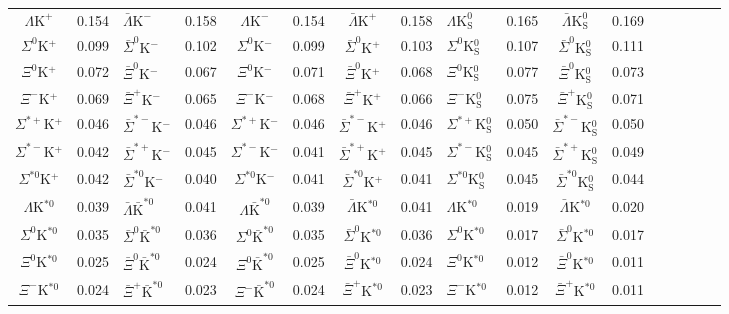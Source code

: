 \documentclass[ALICE,manyauthors]{cernphprep}
\newcommand{\LamKchP}{$\Lambda\mathrm{K^{+}}$\xspace}
\newcommand{\ALamKchM}{$\bar{\Lambda}\mathrm{K^{-}}$\xspace}
\newcommand{\LamKchM}{$\Lambda\mathrm{K^{-}}$\xspace}
\newcommand{\ALamKchP}{$\bar{\Lambda}\mathrm{K^{+}}$\xspace}
\newcommand{\LamKs}{$\Lambda\mathrm{K^{0}_{S}}$\xspace}
\newcommand{\ALamKs}{$\bar{\Lambda}\mathrm{K^{0}_{S}}$\xspace}
\begin{document}
\begin{landscape}
\begin{table}[htbp]
{\begin{tabular}{|c|cV{5.0}c|cV{5.0}c|cV{5.0}c|cV{5.0}c|cV{5.0}c|c|}
  \LamKchP & 0.154 & \ALamKchM & 0.158 & \LamKchM & 0.154 & \ALamKchP & 0.158 & \LamKs & 0.165 & \ALamKs & 0.169 \\
  $\Sigma^{0}$K$^{+}$ & 0.099 & $\bar{\Sigma}^{0}$K$^{-}$ & 0.102 & $\Sigma^{0}$K$^{-}$ & 0.099 & $\bar{\Sigma}^{0}$K$^{+}$ & 0.103 & $\Sigma^{0}$K$^{0}_{\mathrm{S}}$ & 0.107 & $\bar{\Sigma}^{0}$K$^{0}_{\mathrm{S}}$ & 0.111 \\
  $\Xi^{0}$K$^{+}$ & 0.072 & $\bar{\Xi}^{0}$K$^{-}$ & 0.067 & $\Xi^{0}$K$^{-}$ & 0.071 & $\bar{\Xi}^{0}$K$^{+}$ & 0.068 & $\Xi^{0}$K$^{0}_{\mathrm{S}}$ & 0.077 & $\bar{\Xi}^{0}$K$^{0}_{\mathrm{S}}$ & 0.073 \\
  $\Xi^{-}$K$^{+}$ & 0.069 & $\bar{\Xi}^{+}$K$^{-}$ & 0.065 & $\Xi^{-}$K$^{-}$ & 0.068 & $\bar{\Xi}^{+}$K$^{+}$ & 0.066 & $\Xi^{-}$K$^{0}_{\mathrm{S}}$ & 0.075 & $\bar{\Xi}^{+}$K$^{0}_{\mathrm{S}}$ & 0.071 \\
  $\Sigma^{*+}$K$^{+}$ & 0.046 & $\bar{\Sigma}^{*-}$K$^{-}$ & 0.046 & $\Sigma^{*+}$K$^{-}$ & 0.046 & $\bar{\Sigma}^{*-}$K$^{+}$ & 0.046 & $\Sigma^{*+}$K$^{0}_{\mathrm{S}}$ & 0.050 & $\bar{\Sigma}^{*-}$K$^{0}_{\mathrm{S}}$ & 0.050 \\
  $\Sigma^{*-}$K$^{+}$ & 0.042 & $\bar{\Sigma}^{*+}$K$^{-}$ & 0.045 & $\Sigma^{*-}$K$^{-}$ & 0.041 & $\bar{\Sigma}^{*+}$K$^{+}$ & 0.045 & $\Sigma^{*-}$K$^{0}_{\mathrm{S}}$ & 0.045 & $\bar{\Sigma}^{*+}$K$^{0}_{\mathrm{S}}$ & 0.049 \\
  $\Sigma^{*0}$K$^{+}$ & 0.042 & $\bar{\Sigma}^{*0}$K$^{-}$ & 0.040 & $\Sigma^{*0}$K$^{-}$ & 0.041 & $\bar{\Sigma}^{*0}$K$^{+}$ & 0.041 & $\Sigma^{*0}$K$^{0}_{\mathrm{S}}$ & 0.045 & $\bar{\Sigma}^{*0}$K$^{0}_{\mathrm{S}}$ & 0.044 \\
  $\Lambda$K$^{*0}$ & 0.039 & $\bar{\Lambda}\bar{\mathrm{K}}^{*0}$ & 0.041 & $\Lambda\bar{\mathrm{K}}^{*0}$ & 0.039 & $\bar{\Lambda}$K$^{*0}$ & 0.041 & $\Lambda$K$^{*0}$ & 0.019 & $\bar{\Lambda}$K$^{*0}$ & 0.020 \\
  $\Sigma^{0}$K$^{*0}$ & 0.035 & $\bar{\Sigma}^{0}\bar{\mathrm{K}}^{*0}$ & 0.036 & $\Sigma^{0}\bar{\mathrm{K}}^{*0}$ & 0.035 & $\bar{\Sigma}^{0}$K$^{*0}$ & 0.036 & $\Sigma^{0}$K$^{*0}$ & 0.017 & $\bar{\Sigma}^{0}$K$^{*0}$ & 0.017 \\
  $\Xi^{0}$K$^{*0}$ & 0.025 & $\bar{\Xi}^{0}\bar{\mathrm{K}}^{*0}$ & 0.024 & $\Xi^{0}\bar{\mathrm{K}}^{*0}$ & 0.025 & $\bar{\Xi}^{0}$K$^{*0}$ & 0.024 & $\Xi^{0}$K$^{*0}$ & 0.012 & $\bar{\Xi}^{0}$K$^{*0}$ & 0.011 \\
  $\Xi^{-}$K$^{*0}$ & 0.024 & $\bar{\Xi}^{+}\bar{\mathrm{K}}^{*0}$ & 0.023 & $\Xi^{-}\bar{\mathrm{K}}^{*0}$ & 0.024 & $\bar{\Xi}^{+}$K$^{*0}$ & 0.023 & $\Xi^{-}$K$^{*0}$ & 0.012 & $\bar{\Xi}^{+}$K$^{*0}$ & 0.011 \\

\end{tabular}}
\end{table}
\end{landscape}
\end{document}
